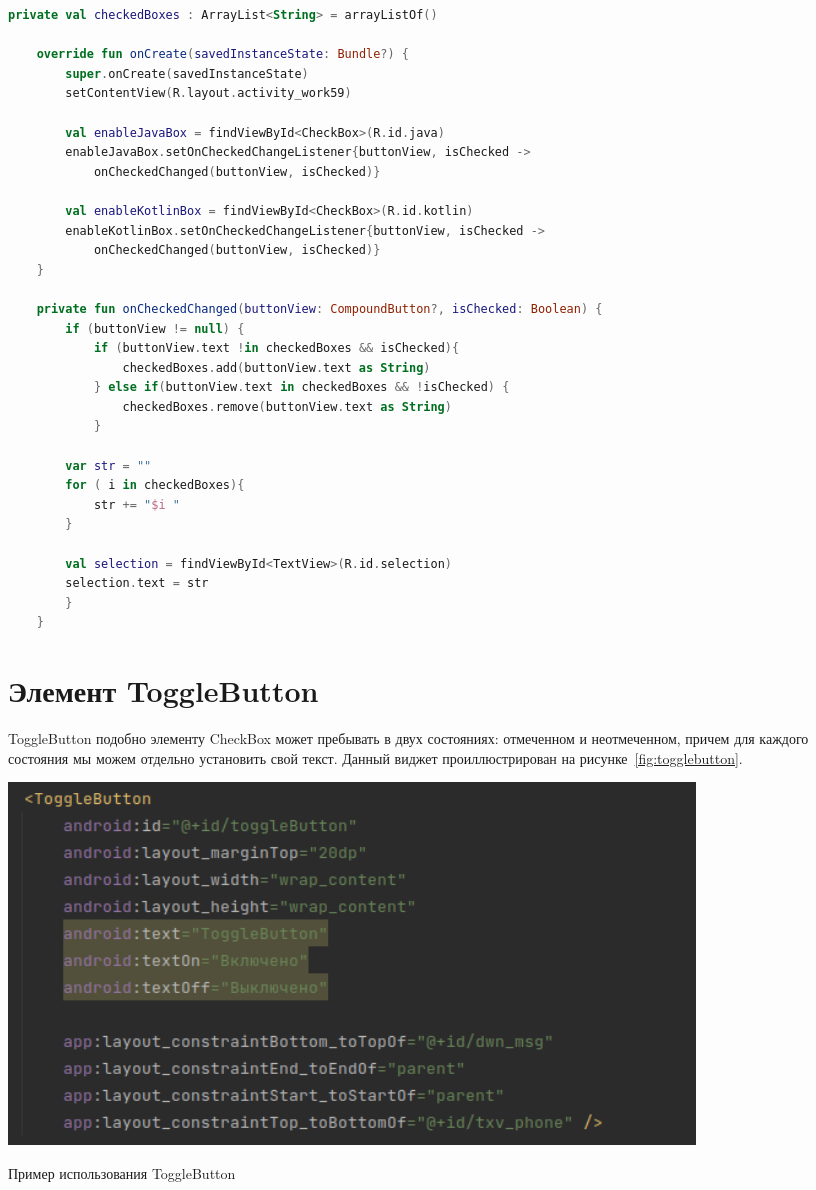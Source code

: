\begin{lstlisting}[language=Kotlin, caption=\leftline{OnCheckedChangeListener Kotlin}, label=lst:OnCheckedChangeListener]
private val checkedBoxes : ArrayList<String> = arrayListOf()

    override fun onCreate(savedInstanceState: Bundle?) {
        super.onCreate(savedInstanceState)
        setContentView(R.layout.activity_work59)

        val enableJavaBox = findViewById<CheckBox>(R.id.java)
        enableJavaBox.setOnCheckedChangeListener{buttonView, isChecked ->
            onCheckedChanged(buttonView, isChecked)}

        val enableKotlinBox = findViewById<CheckBox>(R.id.kotlin)
        enableKotlinBox.setOnCheckedChangeListener{buttonView, isChecked ->
            onCheckedChanged(buttonView, isChecked)}
    }

    private fun onCheckedChanged(buttonView: CompoundButton?, isChecked: Boolean) {
        if (buttonView != null) {
            if (buttonView.text !in checkedBoxes && isChecked){
                checkedBoxes.add(buttonView.text as String)
            } else if(buttonView.text in checkedBoxes && !isChecked) {
                checkedBoxes.remove(buttonView.text as String)
            }

        var str = ""
        for ( i in checkedBoxes){
            str += "$i "
        }

        val selection = findViewById<TextView>(R.id.selection)
        selection.text = str
        }
    }
\end{lstlisting}

\section{Элемент ToggleButton}
ToggleButton подобно элементу CheckBox может пребывать в двух 
состояниях: отмеченном и неотмеченном, причем для каждого состояния мы 
можем отдельно установить свой текст.
Данный виджет проиллюстрирован на рисунке~\ref{fig:togglebutton}.

\begin{image}
	\includegraphics[width=0.8\textwidth]{Screenshot from 2023-03-25 17-55-50.png}
	\caption{Пример использования ToggleButton}
	\label{fig:togglebutton}
\end{image}

